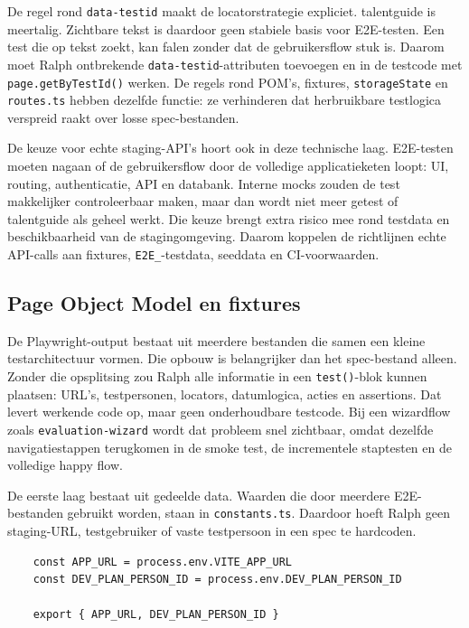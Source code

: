 De regel rond \texttt{data-testid} maakt de locatorstrategie expliciet. talentguide is meertalig. Zichtbare tekst is daardoor geen stabiele basis voor E2E-testen. Een test die op tekst zoekt, kan falen zonder dat de gebruikersflow stuk is. Daarom moet Ralph ontbrekende \texttt{data-testid}-attributen toevoegen en in de testcode met \texttt{page.getByTestId()} werken. De regels rond POM's, fixtures, \texttt{storageState} en \texttt{routes.ts} hebben dezelfde functie: ze verhinderen dat herbruikbare testlogica verspreid raakt over losse spec-bestanden.

De keuze voor echte staging-API's hoort ook in deze technische laag. E2E-testen moeten nagaan of de gebruikersflow door de volledige applicatieketen loopt: UI, routing, authenticatie, API en databank. Interne mocks zouden de test makkelijker controleerbaar maken, maar dan wordt niet meer getest of talentguide als geheel werkt. Die keuze brengt extra risico mee rond testdata en beschikbaarheid van de stagingomgeving. Daarom koppelen de richtlijnen echte API-calls aan fixtures, \texttt{E2E\_}-testdata, seeddata en CI-voorwaarden.

\subsection{Page Object Model en fixtures}

De Playwright-output bestaat uit meerdere bestanden die samen een kleine testarchitectuur vormen. Die opbouw is belangrijker dan het spec-bestand alleen. Zonder die opsplitsing zou Ralph alle informatie in een \texttt{test()}-blok kunnen plaatsen: URL's, testpersonen, locators, datumlogica, acties en assertions. Dat levert werkende code op, maar geen onderhoudbare testcode. Bij een wizardflow zoals \texttt{evaluation-wizard} wordt dat probleem snel zichtbaar, omdat dezelfde navigatiestappen terugkomen in de smoke test, de incrementele staptesten en de volledige happy flow.

De eerste laag bestaat uit gedeelde data. Waarden die door meerdere E2E-bestanden gebruikt worden, staan in \texttt{constants.ts}. Daardoor hoeft Ralph geen staging-URL, testgebruiker of vaste testpersoon in een spec te hardcoden.

\begin{verbatim}
    const APP_URL = process.env.VITE_APP_URL
    const DEV_PLAN_PERSON_ID = process.env.DEV_PLAN_PERSON_ID
    
    export { APP_URL, DEV_PLAN_PERSON_ID }
\end{verbatim}

